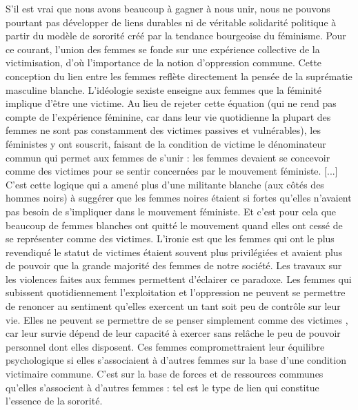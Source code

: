 S'il est vrai que nous avons beaucoup à gagner à nous unir, nous ne pouvons pourtant pas développer de liens durables ni de véritable solidarité politique à partir du modèle de sororité créé par la tendance bourgeoise du féminisme.
Pour ce courant, l'union des femmes se fonde sur une expérience collective de la victimisation, d'où l'importance de la notion d'oppression commune.
Cette conception du lien entre les femmes reflète directement la pensée de la suprématie masculine blanche.
L'idéologie sexiste enseigne aux femmes que la féminité implique d'être une victime.
Au lieu de rejeter cette équation (qui ne rend pas compte de l'expérience féminine, car dans leur vie quotidienne la plupart des femmes ne sont pas constamment des \og victimes \fg\; passives et vulnérables), les féministes y ont souscrit, faisant de la condition de victime le dénominateur commun qui permet aux femmes de s'unir : les femmes devaient se concevoir comme des \og victimes \fg\; pour se sentir concernées par le mouvement féministe.
[...]
C'est cette logique qui a amené plus d'une militante blanche (aux côtés des hommes noirs) à suggérer que les femmes noires étaient si \og fortes \fg\; qu'elles n'avaient pas besoin de s'impliquer dans le mouvement féministe.
Et c'est pour cela que beaucoup de femmes blanches ont quitté le mouvement quand elles ont cessé de se représenter comme des victimes.
L'ironie est que les femmes qui ont le plus revendiqué le statut de \og victimes \fg\; étaient souvent plus privilégiées et avaient plus de pouvoir que la grande majorité des femmes de notre société.
Les travaux sur les violences faites aux femmes permettent d'éclairer ce paradoxe.
Les femmes qui subissent quotidiennement l'exploitation et l'oppression ne peuvent se permettre de renoncer au sentiment qu'elles exercent un tant soit peu de contrôle sur leur vie.
Elles ne peuvent se permettre de se penser simplement comme des \og victimes \fg, car leur survie dépend de leur capacité à exercer sans relâche le peu de pouvoir personnel dont elles disposent.
Ces femmes compromettraient leur équilibre psychologique si elles s'associaient à d'autres femmes sur la base d'une condition victimaire commune.
C'est sur la base de forces et de ressources communes qu'elles s'associent à d'autres femmes : tel est le type de lien qui constitue l'essence de la sororité.
\bigskip

